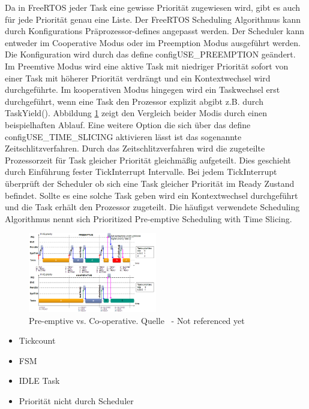 Da in FreeRTOS jeder Task eine gewisse Priorität zugewiesen wird, gibt es auch für jede Priorität genau eine Liste. Der FreeRTOS Scheduling Algorithmus kann durch Konfigurations Präprozessor-defines angepasst werden. Der Scheduler kann entweder im Cooperative Modus oder im Preemption Modus ausgeführt werden. Die Konfiguration wird durch das define configUSE\_PREEMPTION geändert. Im Preemtive Modus wird eine aktive Task mit niedriger Priorität sofort von einer Task mit höherer Priorität verdrängt und ein Kontextwechsel wird durchgeführte. Im kooperativen Modus hingegen wird ein Taskwechsel erst durchgeführt, wenn eine Task den Prozessor explizit abgibt z.B. durch TaskYield(). Abbildung \ref{fig:PreVSCo} zeigt den Vergleich beider Modis durch einen beispielhaften Ablauf. Eine weitere Option die sich über das define configUSE\_TIME\_SLICING aktivieren lässt ist das sogenannte Zeitschlitzverfahren. Durch das Zeitschlitzverfahren wird die zugeteilte Prozessorzeit für Task gleicher Priorität gleichmäßig aufgeteilt. Dies geschieht durch Einführung fester TickInterrupt Intervalle. Bei jedem TickInterrupt überprüft der Scheduler ob sich eine Task gleicher Priorität im Ready Zustand befindet. Sollte es eine solche Task geben wird ein Kontextwechsel durchgeführt und die Task erhält den Prozessor zugeteilt. Die häufigst verwendete Scheduling Algorithmus nennt sich Prioritized Pre-emptive Scheduling with Time Slicing.
\begin{figure}[ht!]
	\centering
		\includegraphics[width=0.5\textwidth]{Pictures/EMCUIT/PreemptiveCooperative.png}
	\caption{Pre-emptive vs. Co-operative. Quelle~\protect{} - Not referenced yet}
	\label{fig:PreVSCo}
\end{figure}

\begin{itemize}
	\item Tickcount
	\item FSM
	\item IDLE Task
	\item Priorität nicht durch Scheduler
\end{itemize}

